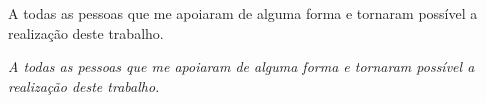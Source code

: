 

\begin{dedicatoria} %

  \newcommand{\mytext}{%
    A todas as pessoas que me apoiaram de alguma forma e tornaram possível a
    realização deste trabalho.
  }

  \ifcalligra
   \calligra\Large \mytext
  \else
   \itshape\Large \mytext
  \fi

\end{dedicatoria}


